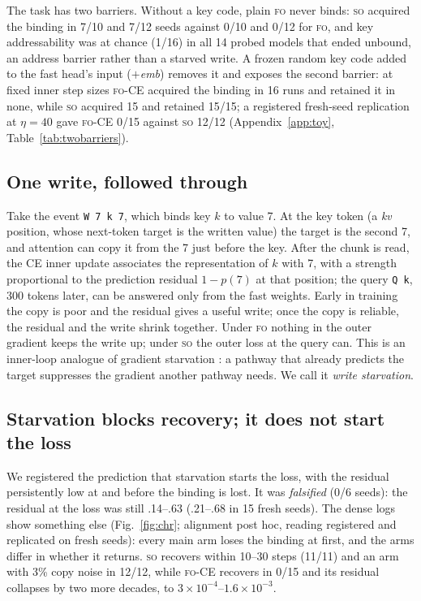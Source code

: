 \documentclass[11pt]{article}
\newcommand{\FO}{\textsc{fo}}
\newcommand{\SO}{\textsc{so}}
\begin{document}
The task has two barriers. Without a key code, plain \FO{} never binds: \SO{} acquired the binding in
7/10 and 7/12 seeds against 0/10 and 0/12 for \FO, and key addressability was at chance (1/16) in all
14 probed models that ended unbound, an address barrier rather than a starved write. A frozen random key code
added to the fast head's input (\emph{$+$emb}) removes it and exposes the second barrier: at fixed
inner step sizes \FO-CE{} acquired the binding in 16 runs and retained it in none, while \SO{} acquired
15 and retained 15/15; a registered fresh-seed replication at $\eta=40$ gave \FO-CE{} 0/15 against
\SO{} 12/12 (Appendix~\ref{app:toy}, Table~\ref{tab:twobarriers}).

\subsection{One write, followed through}
\label{sec:starved}

Take the event \texttt{W 7 k 7}, which binds key $k$ to value 7. At the key token (a \emph{kv}
position, whose next-token target is the written value) the target is the second 7, and attention
can copy it from the 7 just before the key. After the chunk is read, the CE
inner update associates the representation of $k$ with 7, with a strength proportional to the
prediction residual $1-p(7)$ at that position; the query \texttt{Q k}, 300 tokens later, can be
answered only from the fast weights. Early in training the copy is
poor and the residual gives a useful write; once the copy is reliable, the residual and the write
shrink together. Under \FO{} nothing in the outer gradient keeps the write up; under \SO{} the outer
loss at the query can. This is an inner-loop analogue of gradient starvation
\citep{pezeshki2021gradient}: a pathway that already predicts the target suppresses the gradient
another pathway needs. We call it \emph{write starvation}.

\subsection{Starvation blocks recovery; it does not start the loss}
\label{sec:chron}

We registered the prediction that starvation starts the loss, with the residual persistently low at
and before the binding is lost. It was \emph{falsified} (0/6 seeds): the residual at the loss was
still .14--.63 (.21--.68 in 15 fresh seeds). The dense logs show something else (Fig.~\ref{fig:chr};
alignment post hoc, reading registered and replicated on fresh seeds): every main arm loses the
binding at first, and the arms differ in whether it returns. \SO{} recovers
within 10--30 steps (11/11) and an arm with 3\% copy noise in 12/12, while \FO-CE{} recovers in 0/15
and its residual collapses by two more decades, to $3\times10^{-4}$--$1.6\times10^{-3}$.
\end{document}
